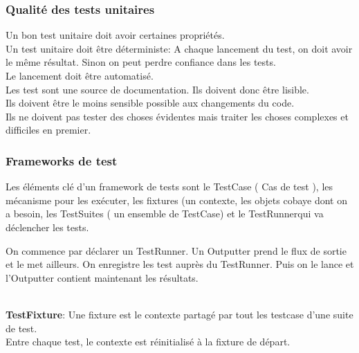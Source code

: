 \subsubsection{Qualité des tests unitaires}
	Un bon test unitaire doit avoir certaines propriétés.
	\\Un test unitaire doit être déterministe: A chaque lancement du test, on doit avoir le même résultat. Sinon on peut perdre confiance dans les tests.
	\\Le lancement doit être automatisé.
	\\Les test sont une source de documentation. Ils doivent donc être lisible.
	\\Ils doivent être le moins sensible possible aux changements du code.
	\\Ils ne doivent pas tester des choses évidentes mais traiter les choses complexes et difficiles en premier.


\subsubsection{Frameworks de test}
	Les éléments clé d’un framework de tests sont le TestCase ( Cas de test ), les mécanisme pour les exécuter, les fixtures (un contexte, les objets cobaye dont on a besoin, les TestSuites ( un ensemble de TestCase) et le TestRunnerqui va déclencher les tests.

	On commence par déclarer un TestRunner. Un Outputter prend le flux de sortie et le met ailleurs. On enregistre les test auprès du TestRunner. Puis on le lance et l’Outputter contient maintenant les résultats.

	\\\textbf{TestFixture}: Une fixture est le contexte partagé par tout les testcase d’une suite de test.
	\\Entre chaque test, le contexte est réinitialisé à la fixture de départ.